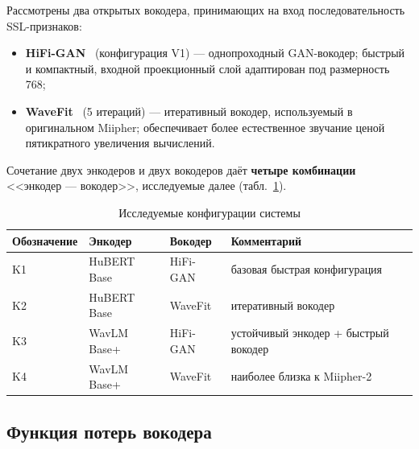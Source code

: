 Рассмотрены два открытых вокодера, принимающих на вход последовательность
SSL-признаков:
\begin{itemize}
    \item \textbf{HiFi-GAN}~\cite{hifigan} (конфигурация V1) --- однопроходный
        GAN-вокодер; быстрый и компактный, входной проекционный слой адаптирован
        под размерность 768;
    \item \textbf{WaveFit}~\cite{wavefit} (5 итераций) --- итеративный вокодер,
        используемый в оригинальном Miipher; обеспечивает более естественное
        звучание ценой пятикратного увеличения вычислений.
\end{itemize}
Сочетание двух энкодеров и двух вокодеров даёт \textbf{четыре комбинации}
<<энкодер — вокодер>>, исследуемые далее (табл.~\ref{tab:configs}).

\begin{table}[H]
    \caption{Исследуемые конфигурации системы}
    \label{tab:configs}
    \centering
    \footnotesize
    \begin{tabularx}{\textwidth}{l l l X}
        \toprule
        Обозначение & Энкодер & Вокодер & Комментарий \\
        \midrule
        K1 & HuBERT Base & HiFi-GAN & базовая быстрая конфигурация \\
        K2 & HuBERT Base & WaveFit  & итеративный вокодер \\
        K3 & WavLM Base+ & HiFi-GAN & устойчивый энкодер + быстрый вокодер \\
        K4 & WavLM Base+ & WaveFit  & наиболее близка к Miipher-2 \\
        \bottomrule
    \end{tabularx}
\end{table}

\subsection{Функция потерь вокодера}
\label{ssec:vocloss}

